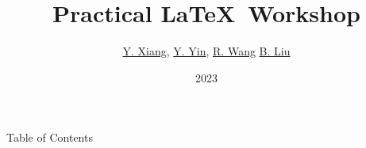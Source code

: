 \documentclass[aspectratio=169]{beamer}
\title{Practical \LaTeX\ Workshop}
\author{\hyperlink{https://github.com/linsyking}{Y. Xiang}, \hyperlink{https://github.com/fakefred}{Y. Yin}, \hyperlink{https://github.com/Hydraallen}{R. Wang} \hyperlink{}{B. Liu}}
\institute{TechJI}
\date{2023}
\begin{document}
\begin{frame}
    \titlepage
\end{frame}

\begin{frame}{Table of Contents}
    \tableofcontents
\end{frame}




\end{document}
